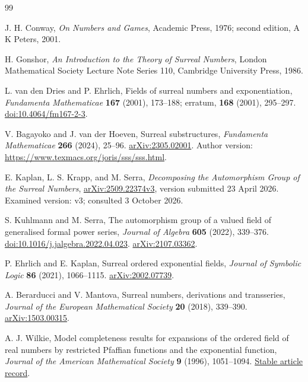 \documentclass[11pt,a4paper]{article}
\numberwithin{equation}{section}
\theoremstyle{plain}
\theoremstyle{definition}
\theoremstyle{remark}
\begin{document}
\begingroup
\small
\setlength{\parskip}{0pt}
\begin{thebibliography}{99}
\setlength{\itemsep}{5pt}

J. H. Conway, \emph{On Numbers and Games}, Academic Press, 1976;
second edition, A K Peters, 2001.

H. Gonshor, \emph{An Introduction to the Theory of Surreal Numbers},
London Mathematical Society Lecture Note Series 110,
Cambridge University Press, 1986.

L. van den Dries and P. Ehrlich, Fields of surreal numbers and
exponentiation, \emph{Fundamenta Mathematicae} \textbf{167} (2001),
173--188; erratum, \textbf{168} (2001), 295--297.
\href{https://doi.org/10.4064/fm167-2-3}{doi:10.4064/fm167-2-3}.

V. Bagayoko and J. van der Hoeven, Surreal substructures,
\emph{Fundamenta Mathematicae} \textbf{266} (2024), 25--96.
\href{https://arxiv.org/abs/2305.02001}{arXiv:2305.02001}.
Author version: \url{https://www.texmacs.org/joris/sss/sss.html}.

E. Kaplan, L. S. Krapp, and M. Serra,
\emph{Decomposing the Automorphism Group of the Surreal Numbers},
\href{https://arxiv.org/abs/2509.22374v3}{arXiv:2509.22374v3},
version submitted 23 April 2026. Examined version: v3;
consulted 3 October 2026.

S. Kuhlmann and M. Serra, The automorphism group of a valued field of
generalised formal power series, \emph{Journal of Algebra}
\textbf{605} (2022), 339--376.
\href{https://doi.org/10.1016/j.jalgebra.2022.04.023}
{doi:10.1016/j.jalgebra.2022.04.023}.
\href{https://arxiv.org/abs/2107.03362}{arXiv:2107.03362}.

P. Ehrlich and E. Kaplan, Surreal ordered exponential fields,
\emph{Journal of Symbolic Logic} \textbf{86} (2021), 1066--1115.
\href{https://arxiv.org/abs/2002.07739}{arXiv:2002.07739}.

A. Berarducci and V. Mantova, Surreal numbers, derivations and transseries,
\emph{Journal of the European Mathematical Society}
\textbf{20} (2018), 339--390.
\href{https://arxiv.org/abs/1503.00315}{arXiv:1503.00315}.

A. J. Wilkie, Model completeness results for expansions of the ordered
field of real numbers by restricted Pfaffian functions and the exponential
function, \emph{Journal of the American Mathematical Society}
\textbf{9} (1996), 1051--1094.
\href{https://www.jstor.org/stable/2152916}{Stable article record}.


\end{thebibliography}
\end{document}
